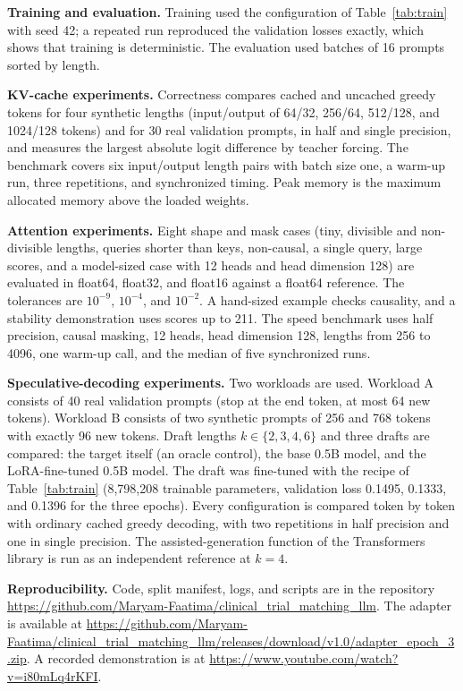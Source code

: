 \documentclass[conference]{IEEEtran}
\begin{document}
\textbf{Training and evaluation.} Training used the configuration of Table~\ref{tab:train} with seed 42; a repeated run reproduced the validation losses exactly, which shows that training is deterministic. The evaluation used batches of 16 prompts sorted by length.

\textbf{KV-cache experiments.} Correctness compares cached and uncached greedy tokens for four synthetic lengths (input/output of 64/32, 256/64, 512/128, and 1024/128 tokens) and for 30 real validation prompts, in half and single precision, and measures the largest absolute logit difference by teacher forcing. The benchmark covers six input/output length pairs with batch size one, a warm-up run, three repetitions, and synchronized timing. Peak memory is the maximum allocated memory above the loaded weights.

\textbf{Attention experiments.} Eight shape and mask cases (tiny, divisible and non-divisible lengths, queries shorter than keys, non-causal, a single query, large scores, and a model-sized case with 12 heads and head dimension 128) are evaluated in float64, float32, and float16 against a float64 reference. The tolerances are $10^{-9}$, $10^{-4}$, and $10^{-2}$. A hand-sized example checks causality, and a stability demonstration uses scores up to 211. The speed benchmark uses half precision, causal masking, 12 heads, head dimension 128, lengths from 256 to 4096, one warm-up call, and the median of five synchronized runs.

\textbf{Speculative-decoding experiments.} Two workloads are used. Workload A consists of 40 real validation prompts (stop at the end token, at most 64 new tokens). Workload B consists of two synthetic prompts of 256 and 768 tokens with exactly 96 new tokens. Draft lengths $k\in\{2,3,4,6\}$ and three drafts are compared: the target itself (an oracle control), the base 0.5B model, and the LoRA-fine-tuned 0.5B model. The draft was fine-tuned with the recipe of Table~\ref{tab:train} (8,798,208 trainable parameters, validation loss 0.1495, 0.1333, and 0.1396 for the three epochs). Every configuration is compared token by token with ordinary cached greedy decoding, with two repetitions in half precision and one in single precision. The assisted-generation function of the Transformers library is run as an independent reference at $k=4$.

\textbf{Reproducibility.} Code, split manifest, logs, and scripts are in the repository \url{https://github.com/Maryam-Faatima/clinical_trial_matching_llm}. The adapter is available at \url{https://github.com/Maryam-Faatima/clinical_trial_matching_llm/releases/download/v1.0/adapter_epoch_3.zip}. A recorded demonstration is at \url{https://www.youtube.com/watch?v=i80mLq4rKFI}.
\end{document}
